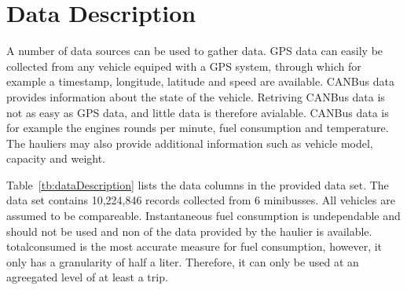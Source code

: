 \section{Data Description}
A number of data sources can be used to gather data.
GPS data can easily be collected from any vehicle equiped with a GPS system, through which for example a timestamp, longitude, latitude and speed are available.
CANBus data provides information about the state of the vehicle.  %
Retriving CANBus data is not as easy as GPS data, and little data is therefore avialable. 
CANBus data is for example the engines rounds per minute, fuel consumption and temperature. 
The hauliers may also provide additional information such as vehicle model, capacity and weight. 

Table~\ref{tb:dataDescription} lists the data columns in the provided data set.
The data set contains 10,224,846 records collected from 6 minibusses. 
All vehicles are assumed to be compareable.%
Instantaneous fuel consumption is undependable and should not be used and non of the data provided by the haulier is available.
totalconsumed is the most accurate measure for fuel consumption, however, it only has a granularity of half a liter. Therefore, it can only be used at an agreegated level of at least a trip.

